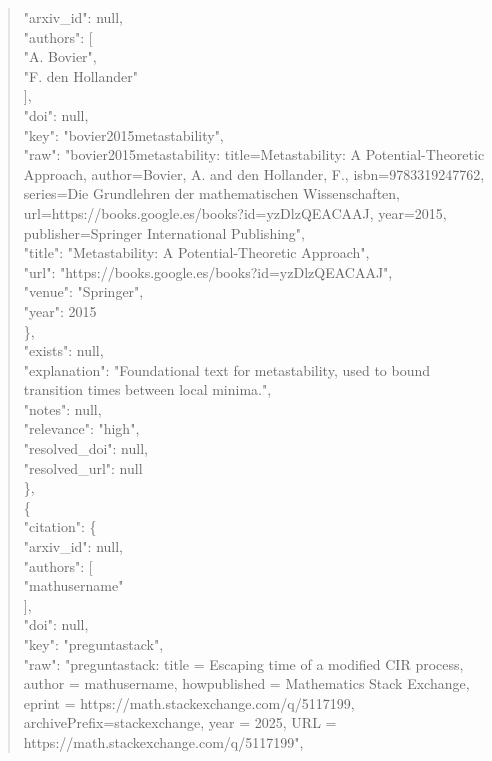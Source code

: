 \documentclass[11pt]{article}
\begin{document}
\begin{quote}
        "arxiv\_id": null,\\
        "authors": [\\
          "A. Bovier",\\
          "F. den Hollander"\\
        ],\\
        "doi": null,\\
        "key": "bovier2015metastability",\\
        "raw": "bovier2015metastability: title=Metastability: A Potential-Theoretic Approach, author=Bovier, A. and den Hollander, F., isbn=9783319247762, series=Die Grundlehren der mathematischen Wissenschaften, url=https://books.google.es/books?id=yzDlzQEACAAJ, year=2015, publisher=Springer International Publishing",\\
        "title": "Metastability: A Potential-Theoretic Approach",\\
        "url": "https://books.google.es/books?id=yzDlzQEACAAJ",\\
        "venue": "Springer",\\
        "year": 2015\\
      \},\\
      "exists": null,\\
      "explanation": "Foundational text for metastability, used to bound transition times between local minima.",\\
      "notes": null,\\
      "relevance": "high",\\
      "resolved\_doi": null,\\
      "resolved\_url": null\\
    \},\\
    \{\\
      "citation": \{\\
        "arxiv\_id": null,\\
        "authors": [\\
          "mathusername"\\
        ],\\
        "doi": null,\\
        "key": "preguntastack",\\
        "raw": "preguntastack: title = Escaping time of a modified CIR process, author = mathusername, howpublished = Mathematics Stack Exchange, eprint = https://math.stackexchange.com/q/5117199, archivePrefix=stackexchange, year = 2025, URL = https://math.stackexchange.com/q/5117199",\\

\end{quote}
\end{document}
